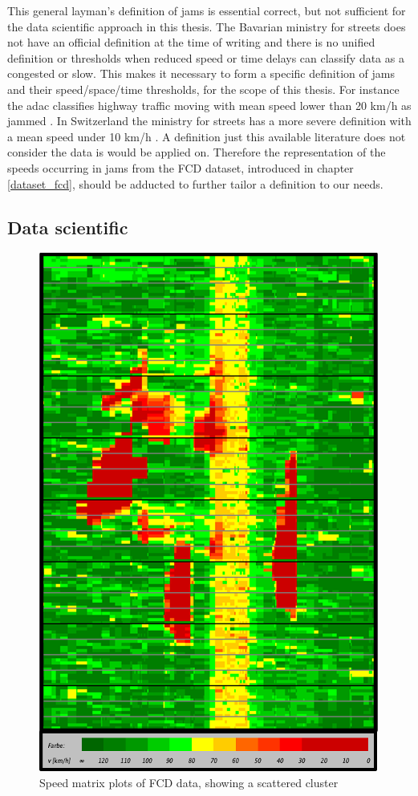 \documentclass[a4paper,12pt]{report}
\begin{document}
This general layman's definition of jams is essential correct, but not sufficient for the data scientific approach in this thesis. The Bavarian ministry for streets does not have an official definition at the time of writing and there is no unified definition or thresholds when reduced speed or time delays can classify data as a congested or slow. This makes it necessary to form a specific definition of \glspl{jam} and their speed/space/time thresholds, for the scope of this thesis. For instance the \acrshort{adac} classifies highway traffic moving with mean speed lower than 20 km/h as jammed \cite{ADAC2019}. In Switzerland the ministry for streets has a more severe definition with a mean speed under 10 km/h \cite{ASTRA2020}. A definition just this available literature does not consider the data is would be applied on. Therefore the representation of the speeds occurring in jams from the FCD dataset, introduced in chapter \ref{dataset_fcd}, should be adducted to further tailor a definition to our needs. 

\subsection{Data scientific}

\begin{figure}[h]
	\centering
	\includegraphics[scale=0.8]{./assets/SpeedMatrixPlot_single}
	\caption{Speed matrix plots of FCD data, showing a scattered cluster}
	\label{img:speedMatrixPlot_singleCluster}
\end{figure}
\end{document}
